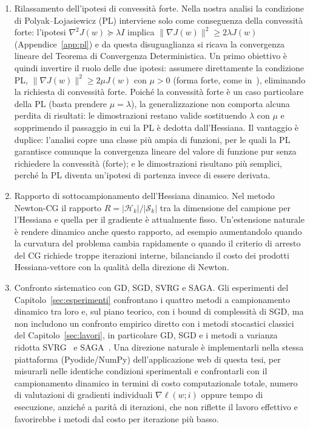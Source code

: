 \documentclass[a4paper,12pt]{article}
\numberwithin{equation}{section}
\numberwithin{figure}{section}
\numberwithin{table}{section}
\begin{document}
\begin{enumerate}\setlength{\itemsep}{1pt}\setlength{\topsep}{3pt}\setlength{\parskip}{0pt}
  \item Rilassamento dell'ipotesi di convessità forte. Nella nostra analisi
  la condizione di Polyak--Lojasiewicz (PL) interviene solo come conseguenza
  della convessità forte: l'ipotesi $\nabla^2 J(w) \succeq \lambda I$ implica
  $\|\nabla J(w)\|^2 \ge 2\lambda J(w)$ (Appendice~\ref{app:pl}) e da questa
  disuguaglianza si ricava la convergenza lineare del Teorema di Convergenza
  Deterministica. Un primo obiettivo è quindi invertire il ruolo delle due
  ipotesi: assumere direttamente la condizione PL,
  $\|\nabla J(w)\|^2 \ge 2\mu J(w)$ con $\mu>0$ (forma forte,
  come in~\cite{polyak1964, karimi2016}), eliminando la richiesta di
  convessità forte. Poiché la convessità forte è un caso particolare della PL
  (basta prendere $\mu = \lambda$), la generalizzazione non comporta alcuna
  perdita di risultati: le dimostrazioni restano valide sostituendo $\lambda$
  con $\mu$ e sopprimendo il passaggio in cui la PL è dedotta dall'Hessiana.
  Il vantaggio è duplice: l'analisi copre una classe più ampia di funzioni,
  per le quali la PL garantisce comunque la convergenza lineare del valore di
  funzione pur senza richiedere la convessità (forte); e le dimostrazioni
  risultano più semplici, perché la PL diventa un'ipotesi di partenza invece
  di essere derivata.
  \item Rapporto di sottocampionamento dell'Hessiana dinamico. Nel
  metodo Newton-CG il rapporto $R = |\mathcal{H}_k|/|\mathcal{S}_k|$ tra la
  dimensione del campione per l'Hessiana e quella per il gradiente è
  attualmente fisso. Un'estensione naturale è rendere dinamico anche
  questo rapporto, ad esempio aumentandolo quando la curvatura del problema
  cambia rapidamente o quando il criterio di arresto del CG richiede troppe
  iterazioni interne, bilanciando il costo dei prodotti Hessiana-vettore con la
  qualità della direzione di Newton.
  \item Confronto sistematico con GD, SGD, SVRG e SAGA. Gli esperimenti del
  Capitolo~\ref{sec:esperimenti} confrontano i quattro metodi a campionamento
  dinamico tra loro e, sul piano teorico, con i bound di complessità di SGD, ma
  non includono un confronto empirico diretto con i metodi stocastici classici
  del Capitolo~\ref{sec:lavori}, in particolare GD, SGD e i metodi a varianza
  ridotta SVRG~\cite{johnson2013} e SAGA~\cite{defazio2014}. Una direzione
  naturale è implementarli nella stessa piattaforma (Pyodide/NumPy)
  dell'applicazione web di questa tesi, per misurarli nelle identiche condizioni
  sperimentali e confrontarli con il campionamento dinamico in termini di costo
  computazionale totale, numero di valutazioni di gradienti individuali
  $\nabla\ell(w;i)$ oppure tempo di esecuzione, anziché a parità di iterazioni,
  che non riflette il lavoro effettivo e favorirebbe i metodi dal costo per
  iterazione più basso.
\end{enumerate}
\end{document}
